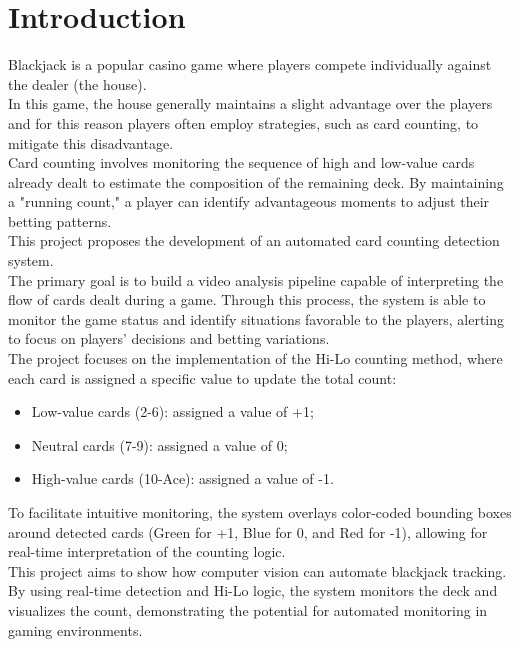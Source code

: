 \section{Introduction}
Blackjack is a popular casino game where players compete individually against the dealer (the house).\\
In this game, the house generally maintains a slight advantage over the players and for this reason players often employ 
strategies, such as card counting, to mitigate this disadvantage. \\
Card counting involves monitoring the sequence of high and low-value cards already dealt to estimate the 
composition of the remaining deck. 
By maintaining a "running count," a player can identify advantageous moments to adjust their betting patterns. 
\\ \newline
This project proposes the development of an automated card counting detection system. \\
The primary goal is to build a video analysis pipeline capable of interpreting the flow of cards dealt during a game.
Through this process, the system is able to monitor the game status and identify situations favorable to the players, alerting
to focus on players' decisions and betting variations.
\\ \newline
The project focuses on the implementation of the Hi-Lo counting method, where each card is assigned a specific value 
to update the total count:
\begin{itemize}
    \item Low-value cards (2-6): assigned a value of +1;
    \item Neutral cards (7-9): assigned a value of 0;
    \item High-value cards (10-Ace): assigned a value of -1.
\end{itemize}
To facilitate intuitive monitoring, the system overlays color-coded bounding boxes around detected cards 
(Green for +1, Blue for 0, and Red for -1), allowing for real-time interpretation of the counting logic.
\\ \newline
This project aims to show how computer vision can automate blackjack tracking. 
By using real-time detection and Hi-Lo logic, the system monitors the deck and visualizes the count, demonstrating 
the potential for automated monitoring in gaming environments.

